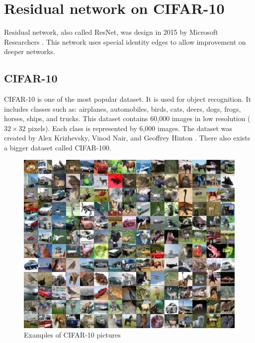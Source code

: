 \documentclass[licencjacka]{pracamgr}
\begin{document}
  	\section{Residual network on CIFAR-10}
  		Residual network, also called ResNet, was design in 2015 by Microsoft Researchers \cite{resnet}. This network uses special identity edges to allow improvement on deeper networks.
		\subsection{CIFAR-10}
		CIFAR-10 is one of the most popular dataset. It is used for object recognition. It includes classes such as: airplanes, automobiles, birds, cats, deers, dogs, frogs, horses, ships, and trucks. This dataset contains 60,000 images in low resolution ($32\times32$ pixels). Each class is represented by 6,000 images. The dataset was created by Alex Krizhevsky, Vinod Nair, and Geoffrey Hinton \cite{cifar}. There also exists a bigger dataset called CIFAR-100.
		\begin{figure}[h]
				\caption{Examples of CIFAR-10 pictures}
				\centering
				\includegraphics[width=\textwidth]{images/cifar-10}
			\end{figure}
\end{document}
